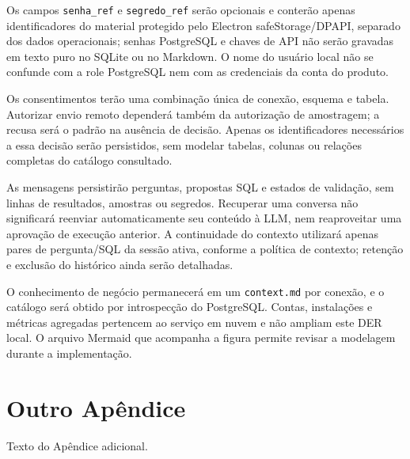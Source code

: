 \begin{apendicesenv}
Os campos \texttt{senha\_ref} e \texttt{segredo\_ref} serão opcionais e conterão apenas identificadores do material protegido pelo Electron safeStorage/DPAPI, separado dos dados operacionais; senhas PostgreSQL e chaves de API não serão gravadas em texto puro no SQLite ou no Markdown. O nome do usuário local não se confunde com a role PostgreSQL nem com as credenciais da conta do produto.

Os consentimentos terão uma combinação única de conexão, esquema e tabela. Autorizar envio remoto dependerá também da autorização de amostragem; a recusa será o padrão na ausência de decisão. Apenas os identificadores necessários a essa decisão serão persistidos, sem modelar tabelas, colunas ou relações completas do catálogo consultado.

As mensagens persistirão perguntas, propostas SQL e estados de validação, sem linhas de resultados, amostras ou segredos. Recuperar uma conversa não significará reenviar automaticamente seu conteúdo à LLM, nem reaproveitar uma aprovação de execução anterior. A continuidade do contexto utilizará apenas pares de pergunta/SQL da sessão ativa, conforme a política de contexto; retenção e exclusão do histórico ainda serão detalhadas.

O conhecimento de negócio permanecerá em um \texttt{context.md} por conexão, e o catálogo será obtido por introspecção do PostgreSQL. Contas, instalações e métricas agregadas pertencem ao serviço em nuvem e não ampliam este DER local. O arquivo Mermaid que acompanha a figura permite revisar a modelagem durante a implementação.


	\chapter{Outro Apêndice}
	
	Texto do Apêndice adicional.



 
\end{apendicesenv}
